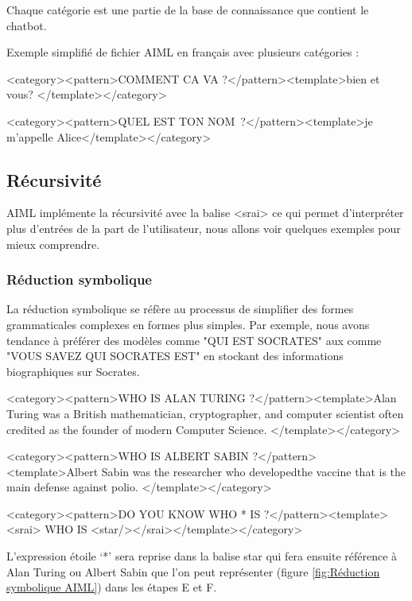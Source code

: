Chaque catégorie est une partie de la base de connaissance que contient le chatbot.
\vspace{1em}

Exemple simplifié de fichier AIML en français avec plusieurs catégories \cite{ref11} :
\vspace{1em}

<category><pattern>COMMENT CA VA ?</pattern><template>bien et vous? </template></category>
\vspace{0.5em}

<category><pattern>QUEL EST TON NOM ?</pattern><template>je m’appelle Alice</template></category>

\subsection{Récursivité}

AIML implémente la récursivité avec la balise <srai> ce qui permet d’interpréter plus d’entrées de la part de l’utilisateur, nous allons voir quelques exemples pour mieux comprendre.

\subsubsection{Réduction symbolique}

La réduction symbolique se réfère au processus de simplifier des formes grammaticales complexes en formes plus simples. Par exemple, nous avons tendance à préférer des modèles comme "QUI EST SOCRATES" aux comme "VOUS SAVEZ QUI SOCRATES EST" en stockant des informations biographiques sur Socrates.
\vspace{1em}

<category><pattern>WHO IS ALAN TURING ?</pattern><template>Alan Turing was a British mathematician, cryptographer, and computer scientist often credited as the founder of modern Computer Science. </template></category>
\vspace{0.5em}

<category><pattern>WHO IS ALBERT SABIN ?</pattern><template>Albert Sabin was the researcher who developedthe vaccine that is the main defense against polio. </template></category>
\vspace{0.5em}

<category><pattern>DO YOU KNOW WHO * IS ?</pattern><template><srai> WHO IS <star/></srai></template></category>
\vspace{1em}

	L’expression étoile ‘*’ sera reprise dans la balise star qui fera ensuite référence à Alan Turing ou Albert Sabin que l’on peut représenter (figure \ref{fig:Réduction symbolique AIML}) dans les étapes E et F.
	\vspace{1em}
	
